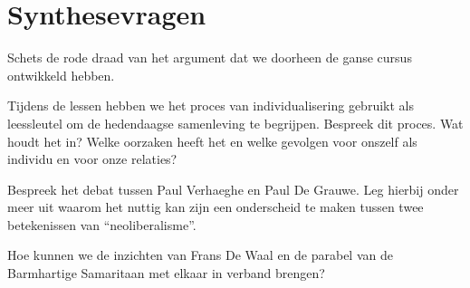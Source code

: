 \documentclass[main.tex]{subfiles}
\begin{document}
\section{Synthesevragen}


\begin{examenvraag}
    \begin{vraag}
        Schets de rode draad van het argument dat we doorheen de ganse cursus ontwikkeld hebben.
    \end{vraag}

    \begin{antwoord}
    \end{antwoord}
\end{examenvraag}


\begin{examenvraag}
    \begin{vraag}
        Tijdens de lessen hebben we het proces van individualisering gebruikt als leessleutel om de hedendaagse samenleving te begrijpen. Bespreek dit proces. Wat houdt het in? Welke oorzaken heeft het en welke gevolgen voor onszelf als individu en voor onze relaties?
    \end{vraag}

    \begin{antwoord}
    \end{antwoord}
\end{examenvraag}


\begin{examenvraag}
    \begin{vraag}
        Bespreek het debat tussen Paul Verhaeghe en Paul De Grauwe. Leg hierbij onder meer uit waarom het nuttig kan zijn een onderscheid te maken tussen twee betekenissen van “neoliberalisme”.
    \end{vraag}

    \begin{antwoord}
    \end{antwoord}
\end{examenvraag}


\begin{examenvraag}
    \begin{vraag}
        Hoe kunnen we de inzichten van Frans De Waal en de parabel van de Barmhartige Samaritaan met elkaar in verband brengen?
    \end{vraag}

    \begin{antwoord}
    \end{antwoord}
\end{examenvraag}
\end{document}
